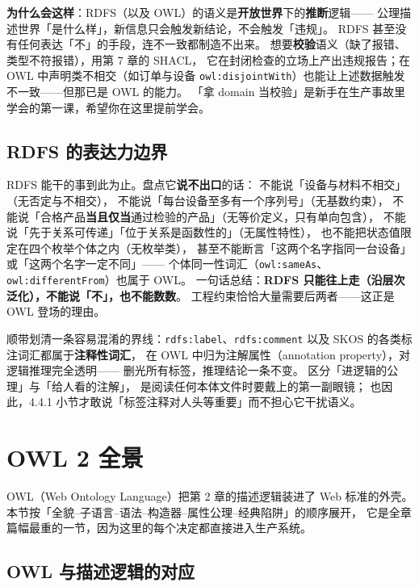 \begin{noteblock}
\textbf{为什么会这样}：RDFS（以及 OWL）的语义是\textbf{开放世界}下的\textbf{推断}逻辑——
公理描述世界「是什么样」，新信息只会触发新结论，不会触发「违规」。
RDFS 甚至没有任何表达「不」的手段，连不一致都制造不出来。
想要\textbf{校验}语义（缺了报错、类型不符报错），用第 7 章的 SHACL，
它在封闭检查的立场上产出违规报告；在 OWL 中声明类不相交（如订单与设备
\texttt{owl:disjointWith}）也能让上述数据触发不一致——但那已是 OWL 的能力。
「拿 domain 当校验」是新手在生产事故里学会的第一课，希望你在这里提前学会。
\end{noteblock}

\subsection{RDFS 的表达力边界}

RDFS 能干的事到此为止。盘点它\textbf{说不出口}的话：
不能说「设备与材料不相交」（无否定与不相交），
不能说「每台设备至多有一个序列号」（无基数约束），
不能说「合格产品\textbf{当且仅当}通过检验的产品」（无等价定义，只有单向包含），
不能说「先于关系可传递」「位于关系是函数性的」（无属性特性），
也不能把状态值限定在四个枚举个体之内（无枚举类），
甚至不能断言「这两个名字指同一台设备」或「这两个名字一定不同」——
个体同一性词汇（\texttt{owl:sameAs}、\texttt{owl:differentFrom}）也属于 OWL。
一句话总结：\textbf{RDFS 只能往上走（沿层次泛化），不能说「不」，也不能数数}。
工程约束恰恰大量需要后两者——这正是 OWL 登场的理由。

顺带划清一条容易混淆的界线：\texttt{rdfs:label}、\texttt{rdfs:comment}
以及 SKOS 的各类标注词汇都属于\textbf{注释性词汇}，
在 OWL 中归为注解属性（annotation property），对逻辑推理完全透明——
删光所有标签，推理结论一条不变。
区分「进逻辑的公理」与「给人看的注解」，
是阅读任何本体文件时要戴上的第一副眼镜；
也因此，4.4.1 小节才敢说「标签注释对人头等重要」而不担心它干扰语义。

\section{OWL 2 全景}

OWL（Web Ontology Language）把第 2 章的描述逻辑装进了 Web 标准的外壳。
本节按「全貌--子语言--语法--构造器--属性公理--经典陷阱」的顺序展开，
它是全章篇幅最重的一节，因为这里的每个决定都直接进入生产系统。

\subsection{OWL 与描述逻辑的对应}


